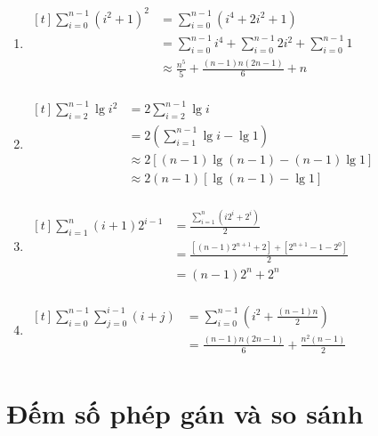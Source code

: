 \documentclass[12pt, letterpaper]{article}
\begin{document}
\begin{enumerate}
	\item $ \begin{aligned}[t]
			      \sum^{n - 1}_{i = 0} {(i^2 + 1)}^2
			       & = \sum^{n - 1}_{i = 0} (i^4 + 2i^2 + 1)                                         \\
			       & = \sum^{n - 1}_{i = 0} i^4 + \sum^{n - 1}_{i = 0} 2i^2 + \sum^{n - 1}_{i = 0} 1 \\
			       & \approx \frac{n^{5}}{5} + \frac{(n - 1)n(2n - 1)}{6} + n                        \\
		      \end{aligned} $

	\item $ \begin{aligned}[t]
			      \sum^{n - 1}_{i = 2} \lg{i^2}
			       & = 2 \sum^{n - 1}_{i = 2} \lg{i}                 \\
			       & = 2 (\sum^{n - 1}_{i = 1} \lg{i} - \lg{1})      \\
			       & \approx 2 [(n - 1)\lg{(n - 1)} - (n - 1)\lg{1}] \\
			       & \approx 2 (n - 1)[\lg{(n - 1)} - \lg{1}]        \\
		      \end{aligned} $

	\item $ \begin{aligned}[t]
			      \sum^{n}_{i = 1} (i + 1)2^{i - 1}
			       & = \frac{\sum^{n}_{i = 1} (i2^i + 2^i)}{2}                  \\
			       & = \frac{[(n - 1)2^{n + 1} + 2] + [2^{n + 1} - 1 - 2^0]}{2} \\
			       & = (n - 1)2^n + 2^n                                         \\
		      \end{aligned} $

	\item $ \begin{aligned}[t]
			      \sum^{n - 1}_{i = 0} \sum^{i - 1}_{j = 0} (i + j)
                  & = \sum^{n - 1}_{i = 0} (i^2 + \frac{(n - 1)n}{2}) \\
                  & = \frac{(n - 1)n(2n - 1)}{6} + \frac{n^2(n - 1)}{2} \\
		      \end{aligned} $
\end{enumerate}

\section{Đếm số phép gán và so sánh}
\end{document}
